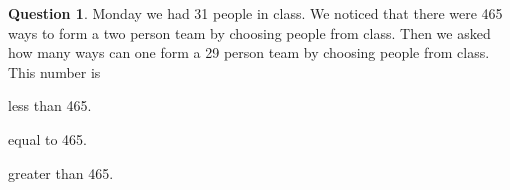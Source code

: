 \documentclass[12pt]{amsart}
\theoremstyle{definition}
\newtheorem{question}{Question}
\begin{document}
\begin{question}
Monday we had 31 people in class. %
We noticed that there were 465 ways to form a two person team by choosing people from class.
Then we asked how many ways can one form a 29 person team by choosing people from class.
This number is
\begin{compactitem}
\item less than 465.
\item equal to 465.
\item greater than 465.
\end{compactitem}
\end{question}
\end{document}
